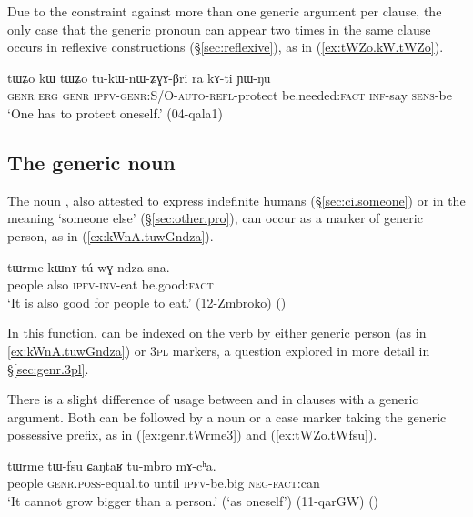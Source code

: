 Due to the constraint against more than one generic argument per clause, the only case that the generic pronoun can appear two times in the same clause occurs in reflexive constructions (§\ref{sec:reflexive}), as in (\ref{ex:tWZo.kW.tWZo}).

\begin{exe}
\ex \label{ex:tWZo.kW.tWZo}
\gll tɯʑo kɯ tɯʑo tu-kɯ-nɯ-ʑɣɤ-βri ra kɤ-ti ɲɯ-ŋu \\
\textsc{genr} \textsc{erg} \textsc{genr} \textsc{ipfv}-\textsc{genr}:S/O-\textsc{auto}-\textsc{refl}-protect be.needed:\textsc{fact} \textsc{inf}-say \textsc{sens}-be \\
\glt `One has to protect oneself.' (04-qala1)
\end{exe} 

\subsection{The generic noun } \label{sec:tWrme.generic}
The noun , also attested to express indefinite humans (§\ref{sec:ci.someone}) or in the meaning `someone else' (§\ref{sec:other.pro}), can occur as a marker of generic person, as in (\ref{ex:kWnA.tuwGndza}).
 
\begin{exe}
\ex \label{ex:kWnA.tuwGndza}
\gll  tɯrme kɯnɤ tú-wɣ-ndza sna. \\
 people also \textsc{ipfv}-\textsc{inv}-eat be.good:\textsc{fact} \\
\glt `It is also good for people to eat.' (12-Zmbroko) ()
\end{exe}
 
In this function,  can be indexed on the verb by either generic person (as in \ref{ex:kWnA.tuwGndza}) or \textsc{3pl} markers, a question explored in more detail in §\ref{sec:genr.3pl}.

There is a slight difference of usage between  and  in clauses with a generic argument. Both can be followed by a noun or a case marker taking the generic possessive prefix, as in (\ref{ex:genr.tWrme3}) and (\ref{ex:tWZo.tWfsu}). 

\begin{exe}
\ex  \label{ex:genr.tWrme3}
\gll tɯrme tɯ-fsu ɕaŋtaʁ tu-mbro mɤ-cʰa. \\
people \textsc{genr}.\textsc{poss}-equal.to until \textsc{ipfv}-be.big \textsc{neg}-\textsc{fact}:can \\ 
\glt `It cannot grow bigger than a person.' (`as oneself') (11-qarGW)
()
\end{exe}


